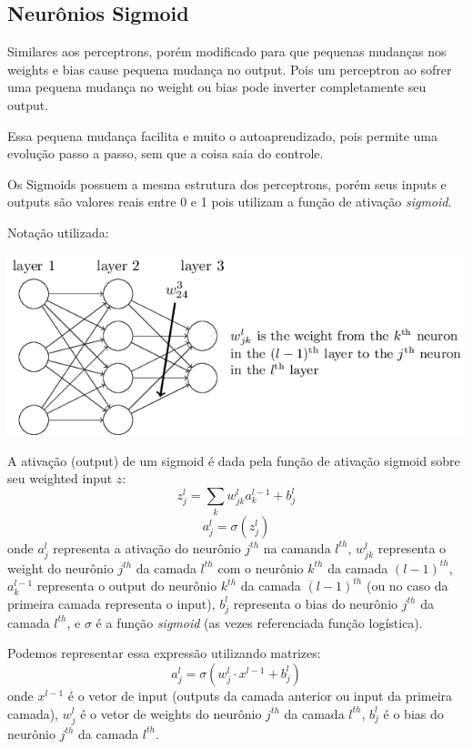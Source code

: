\documentclass[11pt,a4paper,leqno]{article}
\begin{document}
\subsection{Neurônios Sigmoid}

Similares aos perceptrons, porém modificado para que pequenas mudanças nos weights e bias cause pequena mudança no output. Pois um perceptron ao sofrer uma pequena mudança no weight ou bias pode inverter completamente seu output.

Essa pequena mudança facilita e muito o autoaprendizado, pois permite uma evolução passo a passo, sem que a coisa saia do controle.

Os Sigmoids possuem a mesma estrutura dos perceptrons, porém seus inputs e outputs são valores reais entre 0 e 1 pois utilizam a função de ativação \emph{sigmoid}.

Notação utilizada:

\includegraphics[scale=0.5]{Images/neural_network_notation.png} 


A ativação (output) de um sigmoid é dada pela função de ativação sigmoid sobre seu weighted input $z$:
\[
	z^l_j = \sum_k w^{l}_{jk} a^{l-1}_k + b^l_j
\]
\[
  a^{l}_j = \sigma (z^l_j)
\]
onde $a^l_j$ representa a ativação do neurônio $j^{th}$ na camanda $l^{th}$, $w^l_{jk}$ representa o weight do neurônio $j^{th}$ da camada $l^{th}$ com o neurônio $k^{th}$ da camada $(l-1)^{th}$, $a^{l-1}_k$ representa o output do neurônio $k^{th}$ da camada $(l-1)^{th}$ (ou no caso da primeira camada representa o input), $b^l_j$ representa o bias do neurônio $j^{th}$ da camada $l^{th}$, e $\sigma$ é a função \emph{sigmoid} (as vezes referenciada função logística).

Podemos representar essa expressão utilizando matrizes:
\[
 a^l_j = \sigma(w^l_j \cdot x^{l-1} + b^l_j)
\]
onde $x^{l-1}$ é o vetor de input (outputs da camada anterior ou input da primeira camada), $w^l_j$ é o vetor de weights do neurônio $j^{th}$ da camada $l^{th}$, $b^l_j$ é o bias do neurônio $j^{th}$ da camada $l^{th}$.
\end{document}
